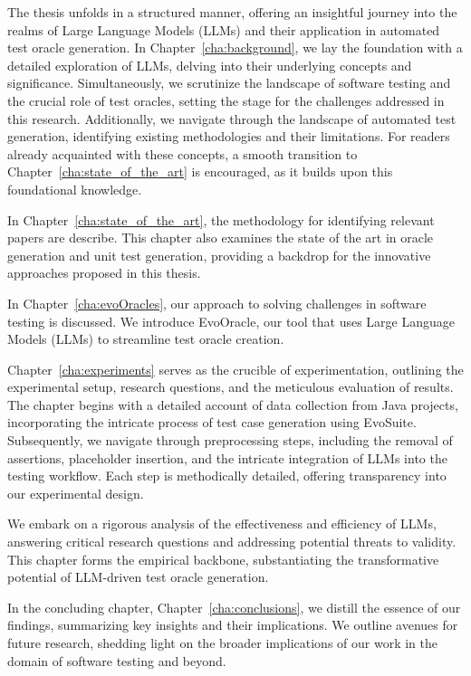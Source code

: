 The thesis unfolds in a structured manner, offering an insightful journey into the realms of Large Language Models (LLMs) and their application in automated test oracle generation. In Chapter~\ref{cha:background}, we lay the foundation with a detailed exploration of LLMs, delving into their underlying concepts and significance. Simultaneously, we scrutinize the landscape of software testing and the crucial role of test oracles, setting the stage for the challenges addressed in this research. Additionally, we navigate through the landscape of automated test generation, identifying existing methodologies and their limitations. For readers already acquainted with these concepts, a smooth transition to Chapter~\ref{cha:state_of_the_art} is encouraged, as it builds upon this foundational knowledge.

In Chapter~\ref{cha:state_of_the_art}, the methodology for identifying relevant papers are describe. This chapter also examines the state of the art in oracle generation and unit test generation, providing a backdrop for the innovative approaches proposed in this thesis.

In Chapter~\ref{cha:evoOracles}, our approach to solving challenges in software testing is discussed. We introduce EvoOracle, our tool that uses Large Language Models (LLMs) to streamline test oracle creation. 

Chapter~\ref{cha:experiments} serves as the crucible of experimentation, outlining the experimental setup, research questions, and the meticulous evaluation of results. The chapter begins with a detailed account of data collection from Java projects, incorporating the intricate process of test case generation using EvoSuite. Subsequently, we navigate through preprocessing steps, including the removal of assertions, placeholder insertion, and the intricate integration of LLMs into the testing workflow. Each step is methodically detailed, offering transparency into our experimental design.

We embark on a rigorous analysis of the effectiveness and efficiency of LLMs, answering critical research questions and addressing potential threats to validity. This chapter forms the empirical backbone, substantiating the transformative potential of LLM-driven test oracle generation.

In the concluding chapter, Chapter~\ref{cha:conclusions}, we distill the essence of our findings, summarizing key insights and their implications. We outline avenues for future research, shedding light on the broader implications of our work in the domain of software testing and beyond.